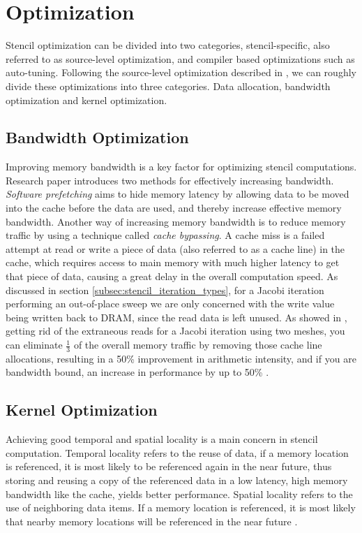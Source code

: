 
\section{Optimization}
\label{sec:optimization}
Stencil optimization can be divided into two categories, stencil-specific, also referred to as source-level optimization, and compiler based optimizations such as auto-tuning. Following the source-level optimization described in \cite{article9}, we can roughly divide these optimizations into three categories.  Data allocation, bandwidth optimization and kernel optimization. 

\subsection{Bandwidth Optimization}
Improving memory bandwidth is a key factor for optimizing stencil computations. Research paper \cite{article9} introduces two methods for effectively increasing bandwidth. \textit{Software prefetching} aims to hide memory latency by allowing data to be moved into the cache before the data are used, and thereby increase effective memory bandwidth. Another way of increasing memory bandwidth is to reduce memory traffic by using a technique called \textit{cache bypassing}. A cache miss is a failed attempt at read or write a piece of data (also referred to as a cache line) in the cache, which requires access to main memory with much higher latency to get that piece of data, causing a great delay in the overall computation speed. As discussed in section \ref{subsec:stencil_iteration_types}, for a Jacobi iteration performing an out-of-place sweep we are only concerned with the write value being written back to DRAM, since the read data is left unused. As showed in \cite{article9}, getting rid of the extraneous reads for a Jacobi iteration using two meshes, you can eliminate \(\frac{1}{3}\) of the overall memory traffic by removing those cache line allocations, resulting in a 50\% improvement in arithmetic intensity, and if you are bandwidth bound, an increase in performance by up to 50\% \cite{article9}.

\subsection{Kernel Optimization}
Achieving good temporal and spatial locality is a main concern in stencil computation. Temporal locality refers to the reuse of data, if a memory location is referenced, it is most likely to be referenced again in the near future, thus storing and reusing a copy of the referenced data in a low latency, high memory bandwidth like the cache, yields better performance. Spatial locality refers to the use of neighboring data items. If a memory location is referenced, it is most likely that nearby memory locations will be referenced in the near future \cite{article14}.


